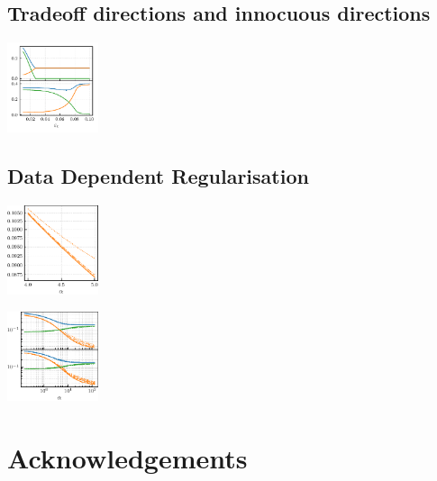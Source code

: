 \documentclass[a0paper,fleqn]{betterportraitposter}
\theoremstyle{plain}
\theoremstyle{definition}
\theoremstyle{remark}
\begin{document}
{\begin{multicols}{3}
\subsection{Tradeoff directions and innocuous directions}


\includegraphics[width=0.2\textwidth]{Assets/optimal_defense.pdf}


\subsection{Data Dependent Regularisation}

\includegraphics[width=0.2\textwidth]{Assets/gen_lambda_optimal_sweep_alpha.pdf}


\includegraphics[width=0.2\textwidth]{Assets/effective_regularisation.pdf}

\section{Acknowledgements}





\end{multicols}

}
\end{document}
